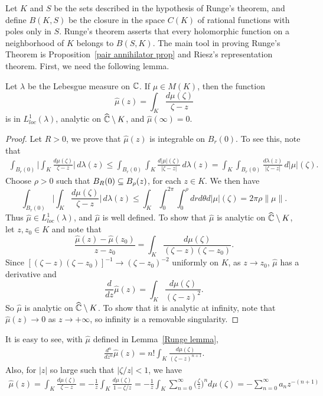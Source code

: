 Let $K$ and $S$ be the sets described in the hypothesis of Runge's theorem, and define $B(K,S)$ be the closure in the space $C(K)$ of rational functions with poles only in $S$. Runge's theorem asserts that every holomorphic function on a neighborhood of $K$ belongs to $B(S,K)$. The main tool in proving Runge's Theorem is Proposition~\ref{pair annihilator prop} and Riesz's representation theorem. First, we need the following lemma.
\begin{lemma}\label{Runge lemma}
Let $\lambda$ be the Lebesgue measure on $\mathbb{C}$. If $\mu\in M(K)$, then the function
\[\hat{\mu}(z)=\int_K\frac{d\mu(\zeta)}{\zeta-z}\]
is in $L^1_{loc}(\lambda)$, analytic on $\widehat{\mathbb{C}}\setminus K$, and $\hat{\mu}(\infty)=0$.
\end{lemma}
\begin{proof}
Let $R>0$, we prove that $\hat{\mu}(z)$ is integrable on $B_r(0)$. To see this, note that
\begin{align*}
\int_{B_r(0)}\Big|\int_K\frac{d\mu(\zeta)}{\zeta-z}\Big|\,d\lambda(z)\leq\int_{B_r(0)}\int_K\frac{d|\mu|(\zeta)}{|\zeta-z|}\,d\lambda(z)=\int_K\int_{B_r(0)}\frac{d\lambda(z)}{|\zeta-z|}\,d|\mu|(\zeta).
\end{align*}
Choose $\rho>0$ such that $B_R(0)\subseteq B_\rho(z)$, for each $z\in K$. We then have
\[\int_{B_r(0)}\Big|\int_K\frac{d\mu(\zeta)}{\zeta-z}\Big|\,d\lambda(z)\leq\int_{K}\int_0^{2\pi}\int_0^\rho drd\theta d|\mu|(\zeta)=2\pi\rho\|\mu\|.\]
Thus $\hat{\mu}\in L^1_{loc}(\lambda)$, and $\hat{\mu}$ is well defined. To show that $\hat{\mu}$ is analytic on $\widehat{\mathbb{C}}\setminus K$, let $z,z_0\in K$ and note that
\[\frac{\hat{\mu}(z)-\hat{\mu}(z_0)}{z-z_0}=\int_K\frac{d\mu(\zeta)}{(\zeta-z)(\zeta-z_0)}.\]
Since $[(\zeta-z)(\zeta-z_0)]^{-1}\to(\zeta-z_0)^{-2}$ uniformly on $K$, as $z\to z_0$, $\hat{\mu}$ has a derivative and 
\[\frac{d}{dz}\hat{\mu}(z)=\int_K\frac{d\mu(\zeta)}{(\zeta-z)^2}.\]
So $\hat{\mu}$ is analytic on $\widehat{\mathbb{C}}\setminus K$. To show that it is analytic at infinity, note that $\hat{\mu}(z)\to 0$ as $z\to+\infty$, so infinity is a removable singularity.
\end{proof}
It is easy to see, with $\hat{\mu}$ defined in Lemma~\ref{Runge lemma},
\begin{align}\label{Runge theorem-1}
\frac{d^n}{dz^n}\hat{\mu}(z)=n!\int_K\frac{d\mu(\zeta)}{(\zeta-z)^{n+1}}.
\end{align}
Also, for $|z|$ so large such that $|\zeta/z|<1$, we have
\begin{align}\label{Runge theorem-2}
\hat{\mu}(z)=\int_K\frac{d\mu(\zeta)}{\zeta-z}=-\frac{1}{z}\int_K\frac{d\mu(\zeta)}{1-\zeta/z}=-\frac{1}{z}\int_K\sum_{n=0}^{\infty}\Big(\frac{\zeta}{z}\Big)^nd\mu(\zeta)=-\sum_{n=0}^{\infty}a_nz^{-(n+1)}
\end{align}
